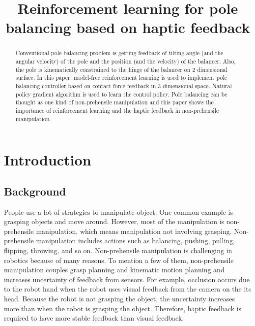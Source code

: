 \documentclass{article}
\title{Reinforcement learning for pole balancing based on haptic feedback}
\author{
}
\begin{document}

\maketitle

\begin{abstract}
 
Conventional pole balancing problem is getting feedback of tilting angle (and the angular velocity) of the pole and the position (and the velocity) of the balancer. Also, the pole is kinematically constrained to the hinge of the balancer on 2 dimensional surface. In this paper, model-free reinforcement learning is used to implement pole balancing controller based on contact force feedback in 3 dimensional space. Natural policy gradient algorithm is used to learn the control policy. Pole balancing can be thought as one kind of non-prehensile manipulation and this paper shows the importance of reinforcement learning and the haptic feedback in non-prehensile manipulation.

\end{abstract}

\section{Introduction}

\subsection{Background}

People use a lot of strategies to manipulate object. One common example is grasping objects and move around. However, most of the manipulation is non-prehensile manipulation, which means manipulation not involving grasping. Non-prehensile manipulation includes actions such as balancing, pushing, pulling, flipping, throwing, and so on. Non-prehensile manipulation is challenging in robotics because of many reasons. To mention a few of them, non-prehensile manipulation couples grasp planning and kinematic motion planning and increases uncertainty of feedback from sensors. For example, occlusion occurs due to the robot hand when the robot uses visual feedback from the camera on the its head. Because the robot is not grasping the object, the uncertainty increases more than when the robot is grasping the object. Therefore, haptic feedback is required to have more stable feedback than visual feedback.
\end{document}
